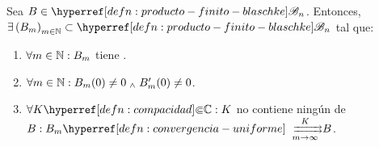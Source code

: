 \begin{teo}\label{teo:aproximacion-prod-finito-blaschke-ceros-simples}
    Sea $B \in \exhyperref[defn:producto-finito-blaschke]{producto-finito-blaschke}{\mathscr{B}_n}$. Entonces, $\exists \left(B_m\right)_{m \in \N} \subset \exhyperref[defn:producto-finito-blaschke]{producto-finito-blaschke}{\mathscr{B}_n}$ tal que:
    \begin{enumerate}[ref=(\arabic*)]
        \item\label{teo:aproximacion-prod-finito-blaschke-ceros-simples:ceros-simples} $\forall m \in \mathbb{N} : B_m$ tiene .
        \item\label{teo:aproximacion-prod-finito-blaschke-ceros-simples:origen} $\forall m \in \mathbb{N} : B_m(0) \neq 0 \; _{\wedge} \; B_m'(0) \neq 0$.
        \item\label{teo:aproximacion-prod-finito-blaschke-ceros-simples:convergencia} $\forall K \exhyperref[defn:compacidad]{compacidad}{\Subset} \C : K$ no contiene ningún  de $B : B_m \exhyperref[defn:convergencia-uniforme]{convergencia-uniforme}{\xrightrightarrows[m \to \infty]{K}} B$.
    \end{enumerate}
\end{teo}
